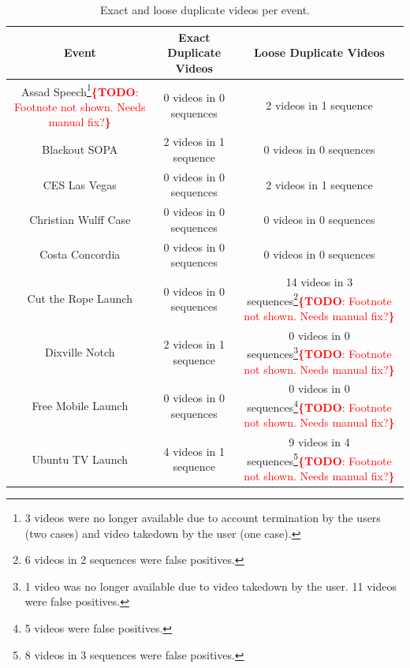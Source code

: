 \documentclass{acm_proc_article-sp}
\newcommand{\todo}[1]{\noindent\textcolor{red}{{\bf \{TODO}: #1{\bf \}}}}
\begin{document}
\begin{table}[htbp]
  \begin{tabular}{ | c | c | c | }
    \hline
    \textbf{Event} & \textbf{Exact Duplicate Videos} & \textbf{Loose Duplicate Videos}\\
    \hline
    Assad Speech\footnote{3 videos were no longer available due to account termination by the users (two cases) and video takedown by the user (one case).}\todo{Footnote not shown. Needs manual fix?} & 0 videos in 0 sequences & 2 videos in 1 sequence\\
    Blackout SOPA & 2 videos in 1 sequence & 0 videos in 0 sequences\\
    CES Las Vegas & 0 videos in 0 sequences & 2 videos in 1 sequence\\
    Christian Wulff Case & 0 videos in 0 sequences & 0 videos in 0 sequences\\
    Costa Concordia & 0 videos in 0 sequences & 0 videos in 0 sequences\\
    Cut the Rope Launch & 0 videos in 0 sequences & 14 videos in 3 sequences\footnote{6 videos in 2 sequences were false positives.}\todo{Footnote not shown. Needs manual fix?}\\
    Dixville Notch & 2 videos in 1 sequence & 0 videos in 0 sequences\footnote{1 video was no longer available due to video takedown by the user. 11 videos were false positives.}\todo{Footnote not shown. Needs manual fix?}\\
    Free Mobile Launch & 0 videos in 0 sequences & 0 videos in 0 sequences\footnote{5 videos were false positives.}\todo{Footnote not shown. Needs manual fix?}\\
    Ubuntu TV Launch & 4 videos in 1 sequence & 9 videos in 4 sequences\footnote{8 videos in 3 sequences were false positives.}\todo{Footnote not shown. Needs manual fix?}\\
    \hline
  \end{tabular}
  \label{tab:duplicatevideos}
  \caption{Exact and loose duplicate videos per event.}
\end{table}
\end{document}
